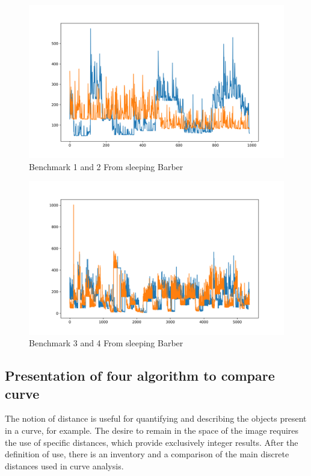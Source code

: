 \documentclass{article}
\begin{document}
\begin{figure}[h!]
    \centering
    \includegraphics[width=1\textwidth]{plot_0.png}
    \caption{Benchmark 1 and 2 From sleeping Barber}
    \label{fig:bench_1_2}
\end{figure}


\begin{figure}[h!]
    \centering
    \includegraphics[width=1\textwidth]{plot_1.png}
    \caption{Benchmark 3 and 4 From sleeping Barber}
    \label{fig:bench_2_3}
\end{figure}

\subsection{Presentation of four algorithm to compare curve}

The notion of distance is useful for quantifying and describing the objects present in
a curve, for example. The desire to remain in the space of the image requires the use of specific distances, which provide exclusively integer results. After the definition of use, there is an inventory and a comparison of the main discrete distances used in curve analysis.
\end{document}
